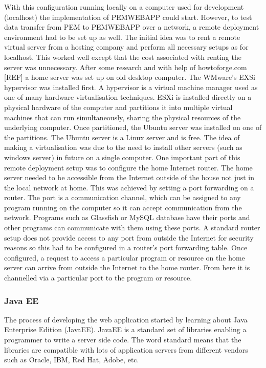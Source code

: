 \documentclass[12pt, a4paper]{report}   %
\begin{document}
\begin{enumerate}
With this configuration running locally on a computer used for development (localhost) the implementation of PEMWEBAPP could start. However, to test data transfer from PEM to PEMWEBAPP over a network, a remote deployment environment had to be set up as well. The initial idea was to rent a remote virtual server from a hosting company and perform all necessary setups as for localhost. This worked well except that the cost associated with renting the server was unnecessary. After some research and with help of howtoforge.com [REF] a home server was set up on old desktop computer. The WMware's EXSi hypervisor was installed first. A hypervisor is a virtual machine manager used as one of many hardware virtualisation techniques. ESXi is installed directly on a physical hardware of the computer and partitions it into multiple virtual machines that can run simultaneously, sharing the physical resources of the underlying computer. Once partitioned, the Ubuntu server was installed on one of the partitions. The Ubuntu server is a Linux server and is free. The idea of making a virtualisation was due to the need to install other servers (such as windows server) in future on a single computer. One important part of this remote deployment setup was to configure the home Internet router. The home server needed to be accessible from the Internet outside of the house not just in the local network at home. This was achieved by setting a port forwarding on a router. The port is a communication channel, which can be assigned to any program running on the computer so it can accept communication from the network. Programs such as Glassfish or MySQL database have their ports and other programs can communicate with them using these ports. A standard router setup does not provide access to any port from outside the Internet for security reasons so this had to be configured in a router's port forwarding table. Once configured, a request to access a particular program or resource on the home server can arrive from outside the Internet to the home router. From here it is channelled via a particular port to the program or resource.

\subsubsection{Java EE}
The process of developing the web application started by learning about Java Enterprise Edition (JavaEE). JavaEE is a standard set of libraries enabling a programmer to write a server side code. The word standard means that the libraries are compatible with lots of application servers from different vendors such as Oracle, IBM, Red Hat, Adobe, etc.


\end{enumerate}
\end{document}
